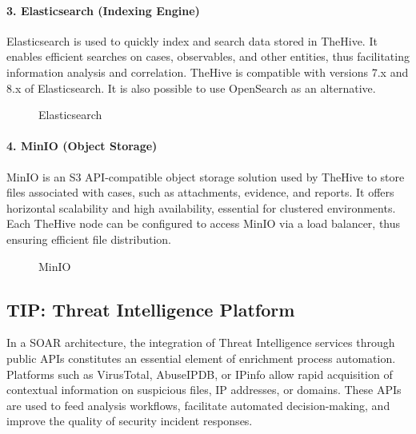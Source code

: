 \paragraph{3. Elasticsearch (Indexing Engine)}

Elasticsearch is used to quickly index and search data stored in TheHive. It enables efficient searches on cases, observables, and other entities, thus facilitating information analysis and correlation. TheHive is compatible with versions 7.x and 8.x of Elasticsearch. It is also possible to use OpenSearch as an alternative.

\begin{figure}[H]
\centering
{}
\caption{Elasticsearch}
\label{fig:elasticsearch}
\end{figure}

\paragraph{4. MinIO (Object Storage)}

MinIO is an S3 API-compatible object storage solution used by TheHive to store files associated with cases, such as attachments, evidence, and reports. It offers horizontal scalability and high availability, essential for clustered environments. Each TheHive node can be configured to access MinIO via a load balancer, thus ensuring efficient file distribution.

\begin{figure}[H]
\centering
{}
\caption{MinIO}
\label{fig:minio}
\end{figure}

\subsection{TIP: Threat Intelligence Platform}
\label{subsec:tip}

In a SOAR architecture, the integration of Threat Intelligence services through public APIs constitutes an essential element of enrichment process automation. Platforms such as VirusTotal, AbuseIPDB, or IPinfo allow rapid acquisition of contextual information on suspicious files, IP addresses, or domains. These APIs are used to feed analysis workflows, facilitate automated decision-making, and improve the quality of security incident responses.

